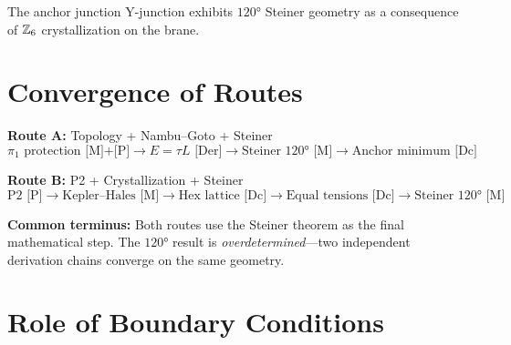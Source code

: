 \begin{resultbox}[title=Corollary: Anchor $120°$ via Route B]
    The anchor junction Y-junction exhibits $120°$ Steiner geometry as a consequence of
    $\mathbb{Z}_6$ crystallization on the brane. \tagDc
\end{resultbox}

\section{Convergence of Routes}
\label{sec:anchor:convergence}

\begin{resultbox}[title=Convergence Statement]
    \textbf{Route A:} Topology + Nambu--Goto + Steiner
    \[
        \pi_1 \text{ protection [M]+[P]} \to E = \tau L \text{ [Der]}
        \to \text{Steiner } 120° \text{ [M]} \to \text{Anchor minimum [Dc]}
    \]

    \textbf{Route B:} P2 + Crystallization + Steiner
    \[
        \text{P2 [P]} \to \text{Kepler--Hales [M]} \to \text{Hex lattice [Dc]}
        \to \text{Equal tensions [Dc]} \to \text{Steiner } 120° \text{ [M]}
    \]

    \textbf{Common terminus:} Both routes use the Steiner theorem as the final
    mathematical step. The $120°$ result is \emph{overdetermined}---two independent
    derivation chains converge on the same geometry.
\end{resultbox}

\section{Role of Boundary Conditions}
\label{sec:anchor:BC}


